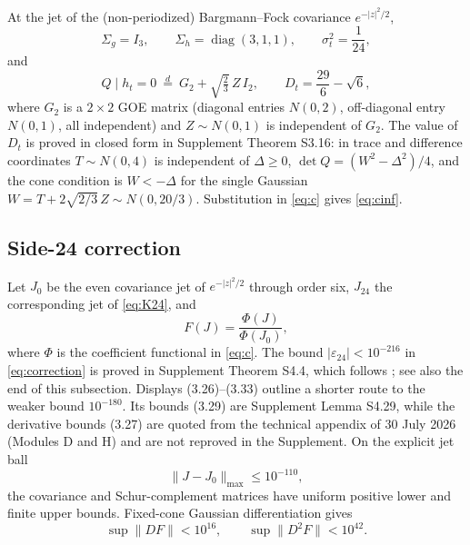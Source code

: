At the jet of the (non-periodized) Bargmann--Fock covariance $e^{-|z|^2/2}$,
\begin{equation}\tag{3.23}
\Sigma_g=I_3,\qquad \Sigma_h=\operatorname{diag}(3,1,1),\qquad \sigma_t^2=\frac1{24},
\end{equation}
and
\begin{equation}\tag{3.24}
Q\mid h_t=0\ \stackrel{d}{=}\ G_2+\sqrt{\tfrac23}\,Z\,I_2,\qquad D_t=\frac{29}{6}-\sqrt6,
\end{equation}
where $G_2$ is a $2\times2$ GOE matrix (diagonal entries $N(0,2)$, off-diagonal entry $N(0,1)$, all independent) and $Z\sim N(0,1)$ is independent of $G_2$. The value of $D_t$ is proved in closed form in Supplement Theorem S3.16: in trace and difference coordinates $T\sim N(0,4)$ is independent of $\Delta\ge0$, $\det Q=(W^2-\Delta^2)/4$, and the cone condition is $W<-\Delta$ for the single Gaussian $W=T+2\sqrt{2/3}\,Z\sim N(0,20/3)$. Substitution in \eqref{eq:c} gives \eqref{eq:cinf}.

\subsection{Side-24 correction}\label{ssec:correction}

Let $J_0$ be the even covariance jet of $e^{-|z|^2/2}$ through order six, $J_{24}$ the corresponding jet of \eqref{eq:K24}, and
\begin{equation}\tag{3.25}
F(J)=\frac{\Phi(J)}{\Phi(J_0)},
\end{equation}
where $\Phi$ is the coefficient functional in \eqref{eq:c}. The bound $|\varepsilon_{24}|<10^{-216}$ in \eqref{eq:correction} is proved in Supplement Theorem S4.4, which follows ; see also the end of this subsection. Displays (3.26)--(3.33) outline a shorter route to the weaker bound $10^{-180}$. Its bounds (3.29) are Supplement Lemma S4.29, while the derivative bounds (3.27) are quoted from the technical appendix of 30 July 2026 (Modules D and H) and are not reproved in the Supplement. On the explicit jet ball
\begin{equation}\tag{3.26}
\|J-J_0\|_{\max}\le10^{-110},
\end{equation}
the covariance and Schur-complement matrices have uniform positive lower and finite upper bounds. Fixed-cone Gaussian differentiation gives
\begin{equation}\tag{3.27}
\sup\|DF\|<10^{16},\qquad \sup\|D^2F\|<10^{42}.
\end{equation}

